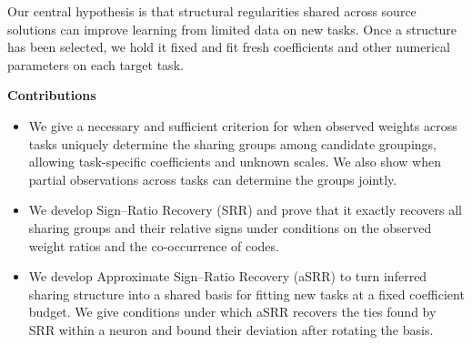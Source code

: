 Our central hypothesis is that structural regularities shared across
source solutions can improve learning from limited data on new tasks.
Once a structure has been selected, we hold it fixed and fit fresh
coefficients and other numerical parameters on each target task.

\begin{samepage}
\noindent\textbf{Contributions}
\begin{itemize}
    \item We give a necessary and sufficient criterion for when observed
        weights across tasks uniquely determine the sharing groups among
        candidate groupings, allowing task-specific coefficients and
        unknown scales. We also show when partial observations across
        tasks can determine the groups jointly.
    \item We develop Sign--Ratio Recovery (SRR) and prove that it exactly
        recovers all sharing groups and their relative signs under
        conditions on the observed weight ratios and the co-occurrence
        of codes.
    \item We develop Approximate Sign--Ratio Recovery (aSRR) to turn
        inferred sharing structure into a shared basis for fitting new
        tasks at a fixed coefficient budget. We give conditions under
        which aSRR recovers the ties found by SRR within a neuron and
        bound their deviation after rotating the basis.
\end{itemize}
\end{samepage}
